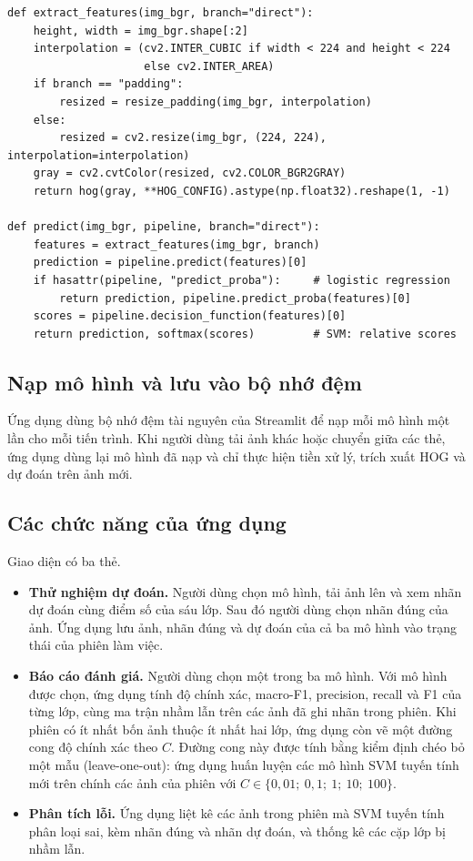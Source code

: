 \begin{lstlisting}[caption={Trích xuất đặc trưng và dự đoán trong ứng dụng web (rút gọn)},label={lst:app}]
def extract_features(img_bgr, branch="direct"):
    height, width = img_bgr.shape[:2]
    interpolation = (cv2.INTER_CUBIC if width < 224 and height < 224
                     else cv2.INTER_AREA)
    if branch == "padding":
        resized = resize_padding(img_bgr, interpolation)
    else:
        resized = cv2.resize(img_bgr, (224, 224), interpolation=interpolation)
    gray = cv2.cvtColor(resized, cv2.COLOR_BGR2GRAY)
    return hog(gray, **HOG_CONFIG).astype(np.float32).reshape(1, -1)

def predict(img_bgr, pipeline, branch="direct"):
    features = extract_features(img_bgr, branch)
    prediction = pipeline.predict(features)[0]
    if hasattr(pipeline, "predict_proba"):     # logistic regression
        return prediction, pipeline.predict_proba(features)[0]
    scores = pipeline.decision_function(features)[0]
    return prediction, softmax(scores)         # SVM: relative scores
\end{lstlisting}

\subsection{Nạp mô hình và lưu vào bộ nhớ đệm}

Ứng dụng dùng bộ nhớ đệm tài nguyên của Streamlit để nạp mỗi mô hình một lần cho mỗi tiến trình. Khi người dùng tải ảnh khác hoặc chuyển giữa các thẻ, ứng dụng dùng lại mô hình đã nạp và chỉ thực hiện tiền xử lý, trích xuất HOG và dự đoán trên ảnh mới.

\subsection{Các chức năng của ứng dụng}

Giao diện có ba thẻ.

\begin{itemize}
  \item \textbf{Thử nghiệm dự đoán.} Người dùng chọn mô hình, tải ảnh lên và xem nhãn dự đoán cùng điểm số của sáu lớp. Sau đó người dùng chọn nhãn đúng của ảnh. Ứng dụng lưu ảnh, nhãn đúng và dự đoán của cả ba mô hình vào trạng thái của phiên làm việc.
  \item \textbf{Báo cáo đánh giá.} Người dùng chọn một trong ba mô hình. Với mô hình được chọn, ứng dụng tính độ chính xác, macro-F1, precision, recall và F1 của từng lớp, cùng ma trận nhầm lẫn trên các ảnh đã ghi nhãn trong phiên. Khi phiên có ít nhất bốn ảnh thuộc ít nhất hai lớp, ứng dụng còn vẽ một đường cong độ chính xác theo $C$. Đường cong này được tính bằng kiểm định chéo bỏ một mẫu (leave-one-out): ứng dụng huấn luyện các mô hình SVM tuyến tính mới trên chính các ảnh của phiên với $C \in \{0{,}01;\ 0{,}1;\ 1;\ 10;\ 100\}$.
  \item \textbf{Phân tích lỗi.} Ứng dụng liệt kê các ảnh trong phiên mà SVM tuyến tính phân loại sai, kèm nhãn đúng và nhãn dự đoán, và thống kê các cặp lớp bị nhầm lẫn.
\end{itemize}

